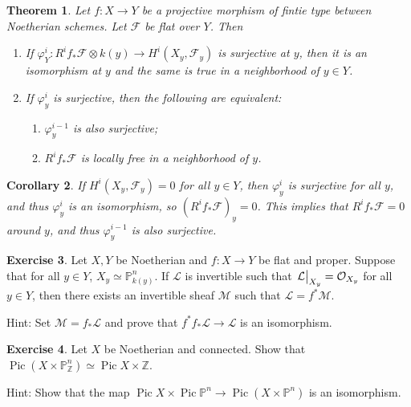 \documentclass[leqno, openany]{memoir}
\newtheorem{thm}{Theorem}[section]
\newtheorem{cor}[thm]{Corollary}
\theoremstyle{definition}
\newtheorem{exer}[thm]{Exercise}
\theoremstyle{remark}
\theoremstyle{plain}
\theoremstyle{definition}
\theoremstyle{remark}
\newcommand{\Z}{\mathbb{Z}}
\renewcommand{\P}{\mathbb{P}}
\newcommand{\mc}[1]{\mathcal{#1}}
\DeclareMathOperator{\Pic}{Pic}
\begin{document}
\begin{thm}
    Let $f \colon X \to Y$ be a projective morphism of fintie type between Noetherian schemes. Let $\mc{F}$ be flat over $Y$. Then
    \begin{enumerate}
        \item If $\varphi^i_Y \colon  R^i f_* \mc{F} \otimes k(y)  \to H^i(X_y, \mc{F}_y)$ is surjective at $y$, then it is an isomorphism at $y$ and the same is true in a neighborhood of $y \in Y$.
        \item If $\varphi_y^i$ is surjective, then the following are equivalent:
            \begin{enumerate}
                \item $\varphi_y^{i-1}$ is also surjective;
                \item $R^i f_* \mc{F}$ is locally free in a neighborhood of $y$.
            \end{enumerate}
    \end{enumerate}
\end{thm}

\begin{cor}
    If $H^i(X_y, \mc{F}_y) = 0$ for all $y \in Y$, then $\varphi_y^i$ is surjective for all $y$, and thus $\varphi_y^i$ is an isomorphism, so ${(R^i f_* \mc{F})}_y = 0$. This implies that $R^i f_* \mc{F} = 0$ around $y$, and thus $\varphi_y^{i-1}$ is also surjective.
\end{cor}

\begin{exer}
    Let $X, Y$ be Noetherian and $f \colon X \to Y$ be flat and proper. Suppose that for all $y \in Y$, $X_y \simeq \P^n_{k(y)}$. If $\mc{L}$ is invertible such that $\eval{\mc{L}}_{X_y} = \mc{O}_{X_y}$ for all $y \in Y$, then there exists an invertible sheaf $\mc{M}$ such that $\mc{L} = f^* \mc{M}$.

    Hint: Set $\mc{M} = f_* \mc{L}$ and prove that $f^* f_* \mc{L} \to \mc{L}$ is an isomorphism.
\end{exer}

\begin{exer}
    Let $X$ be Noetherian and connected. Show that $\Pic(X \times \P^n_{\Z}) \simeq \Pic X \times \Z$.

    Hint: Show that the map $\Pic X \times \Pic \P^n \to \Pic (X \times \P^n)$ is an isomorphism.
\end{exer}
\end{document}
